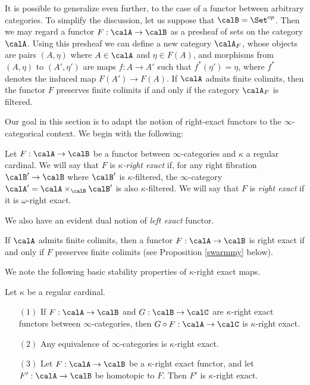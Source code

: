 It is possible to generalize even further, to the case of a functor between arbitrary categories. To simplify the discussion, let us suppose that $\calB = \Set^{op}$. Then we may regard a functor $F: \calA \rightarrow \calB$ as a presheaf of sets on the category $\calA$. Using this presheaf we can define a new category $\calA_{F}$, whose objects are pairs $(A, \eta)$ where $A \in \calA$ and
$\eta \in F(A)$, and morphisms from $(A, \eta)$ to $(A', \eta')$ are maps $f: A \rightarrow A'$
such that $f^{\ast}(\eta') = \eta$, where $f^{\ast}$ denotes the induced map
$F(A') \rightarrow F(A)$. If $\calA$ admits finite colimits, then the functor $F$ preserves finite colimits if and only if the category $\calA_{F}$ is filtered.

Our goal in this section is to adapt the notion of right-exact functors to the $\infty$-categorical context. We begin with the following:

\begin{definition}\label{spuss}
Let $F: \calA \rightarrow \calB$ be a functor between $\infty$-categories and $\kappa$ a regular cardinal. We will say that
$F$ is {\it $\kappa$-right exact} if, for any right fibration $\calB' \rightarrow \calB$
where $\calB'$ is $\kappa$-filtered, the $\infty$-category $\calA' = \calA \times_{\calB} \calB'$ is also $\kappa$-filtered. We will say that $F$ is {\it right exact} if it is $\omega$-right exact.
\end{definition}

\begin{remark}
We also have an evident dual notion of {\em left exact} functor.
\end{remark}

\begin{remark}
If $\calA$ admits finite colimits, then a functor $F: \calA \rightarrow \calB$ is right exact
if and only if $F$ preserves finite colimits (see Proposition \ref{swarmmy} below).
\end{remark}

We note the following basic stability properties of $\kappa$-right exact maps.

\begin{proposition}
Let $\kappa$ be a regular cardinal.
\begin{itemize}
\item[$(1)$] If $F: \calA \rightarrow \calB$ and $G: \calB \rightarrow \calC$ are $\kappa$-right
exact functors between $\infty$-categories, then $G \circ F: \calA \rightarrow \calC$ is $\kappa$-right exact.
\item[$(2)$] Any equivalence of $\infty$-categories is $\kappa$-right exact.
\item[$(3)$] Let $F: \calA \rightarrow \calB$ be a $\kappa$-right exact functor, and let
$F': \calA \rightarrow \calB$ be homotopic to $F$. Then $F'$ is $\kappa$-right exact.
\end{itemize}
\end{proposition}

